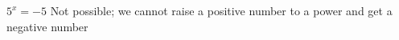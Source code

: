 {$\displaystyle 5^x = -5$}
{Not possible; we cannot raise a positive number to a power and get a negative number}
